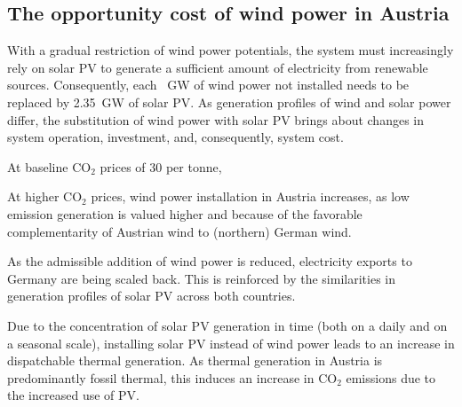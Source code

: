 \documentclass[review, 3p, times]{elsarticle} %
\newcommand{\COO}{\ensuremath{\mathrm{CO_2}} }
\begin{document}
    \subsection{The opportunity cost of wind power in Austria}\label{subsec:opportunity-cost-wind}
    With a gradual restriction of wind power potentials, the system must increasingly rely on solar PV to generate a
    sufficient amount of electricity from renewable sources.
    Consequently, each \SI{}{\giga\watt} of wind power not installed needs to be replaced by \SI{2.35}{\giga\watt} of
    solar PV\@.
    As generation profiles of wind and solar power differ, the substitution of wind power with solar PV brings about
    changes in system operation, investment, and, consequently, system cost.

    At baseline \COO prices of $30$ \EUR per tonne,

    At higher \COO prices, wind power installation in Austria increases, as low emission generation is valued higher
    and because of the favorable complementarity of Austrian wind to (northern) German wind.


    As the admissible addition of wind power is reduced, electricity exports to Germany are being scaled back.
    This is reinforced by the similarities in generation profiles of solar PV across both countries.

    Due to the concentration of solar PV generation in time (both on a daily and on a seasonal scale), installing solar
    PV instead of wind power leads to an increase in dispatchable thermal generation.
    As thermal generation in Austria is predominantly fossil thermal, this induces an increase in \COO emissions due
    to the increased use of PV\@.
\end{document}
